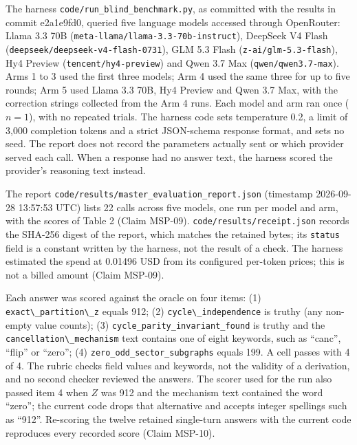 \documentclass[
  11pt,
]{article}
\newcommand{\passthrough}[1]{#1}
\begin{document}
The harness \nolinkurl{code/run_blind_benchmark.py}, as committed with
the results in commit e2a1e9fd0, queried five language models accessed
through OpenRouter: Llama 3.3 70B
(\nolinkurl{meta-llama/llama-3.3-70b-instruct}), DeepSeek V4 Flash
(\nolinkurl{deepseek/deepseek-v4-flash-0731}), GLM 5.3 Flash
(\passthrough{\lstinline!z-ai/glm-5.3-flash!}), Hy4 Preview
(\passthrough{\lstinline!tencent/hy4-preview!}) and Qwen 3.7 Max
(\passthrough{\lstinline!qwen/qwen3.7-max!}). Arms 1 to 3 used the first
three models; Arm 4 used the same three for up to five rounds; Arm 5
used Llama 3.3 70B, Hy4 Preview and Qwen 3.7 Max, with the correction
strings collected from the Arm 4 runs. Each model and arm ran once
(\(n = 1\)), with no repeated trials. The harness code sets temperature
0.2, a limit of 3,000 completion tokens and a strict JSON-schema
response format, and sets no seed. The report does not record the
parameters actually sent or which provider served each call. When a
response had no answer text, the harness scored the provider's reasoning
text instead.

The report \nolinkurl{code/results/master_evaluation_report.json}
(timestamp 2026-09-28 13:57:53 UTC) lists 22 calls across five models,
one run per model and arm, with the scores of Table 2 (Claim MSP-09).
\nolinkurl{code/results/receipt.json} records the SHA-256 digest of the
report, which matches the retained bytes; its
\passthrough{\lstinline!status!} field is a constant written by the
harness, not the result of a check. The harness estimated the spend at
0.01496 USD from its configured per-token prices; this is not a billed
amount (Claim MSP-09).

Each answer was scored against the oracle on four items: (1)
\passthrough{\lstinline!exact\_partition\_z!} equals 912; (2)
\passthrough{\lstinline!cycle\_independence!} is truthy (any non-empty
value counts); (3) \nolinkurl{cycle_parity_invariant_found} is truthy
and the \passthrough{\lstinline!cancellation\_mechanism!} text contains
one of eight keywords, such as ``canc'', ``flip'' or ``zero''; (4)
\nolinkurl{zero_odd_sector_subgraphs} equals 199. A cell passes with 4
of 4. The rubric checks field values and keywords, not the validity of a
derivation, and no second checker reviewed the answers. The scorer used
for the run also passed item 4 when \(Z\) was 912 and the mechanism text
contained the word ``zero''; the current code drops that alternative and
accepts integer spellings such as ``912''. Re-scoring the twelve
retained single-turn answers with the current code reproduces every
recorded score (Claim MSP-10).
\end{document}
